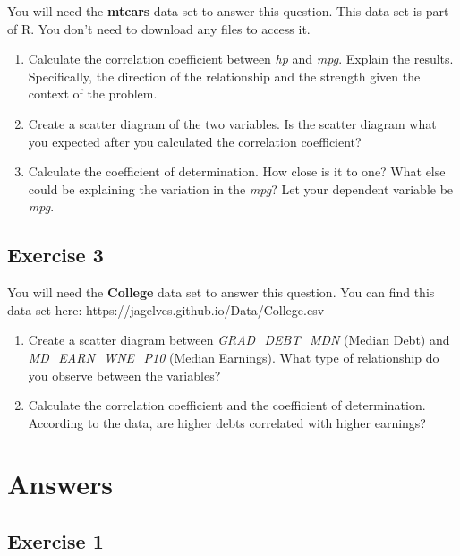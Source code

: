 \documentclass[
  letterpaper,
  DIV=11,
  numbers=noendperiod]{scrreprt}
\begin{document}
You will need the \textbf{mtcars} data set to answer this question. This
data set is part of R. You don't need to download any files to access
it.

\begin{enumerate}
\def\labelenumi{\arabic{enumi}.}
\item
  Calculate the correlation coefficient between \emph{hp} and
  \emph{mpg}. Explain the results. Specifically, the direction of the
  relationship and the strength given the context of the problem.
\item
  Create a scatter diagram of the two variables. Is the scatter diagram
  what you expected after you calculated the correlation coefficient?
\item
  Calculate the coefficient of determination. How close is it to one?
  What else could be explaining the variation in the \emph{mpg}? Let
  your dependent variable be \emph{mpg}.
\end{enumerate}

\hypertarget{exercise-3-10}{%
\subsection*{Exercise 3}\label{exercise-3-10}}

You will need the \textbf{College} data set to answer this question. You
can find this data set here: https://jagelves.github.io/Data/College.csv

\begin{enumerate}
\def\labelenumi{\arabic{enumi}.}
\item
  Create a scatter diagram between \emph{GRAD\_DEBT\_MDN} (Median Debt)
  and \emph{MD\_EARN\_WNE\_P10} (Median Earnings). What type of
  relationship do you observe between the variables?
\item
  Calculate the correlation coefficient and the coefficient of
  determination. According to the data, are higher debts correlated with
  higher earnings?
\end{enumerate}

\hypertarget{answers-5}{%
\section{Answers}\label{answers-5}}

\hypertarget{exercise-1-11}{%
\subsection*{Exercise 1}\label{exercise-1-11}}
\end{document}
